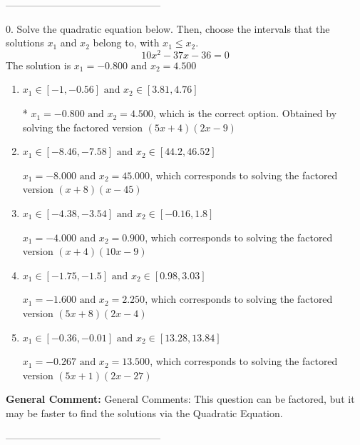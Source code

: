 \documentclass{extbook}[14pt]
\begin{document}
-----------------------------------------------

0. Solve the quadratic equation below. Then, choose the intervals that the solutions $x_1$ and $x_2$ belong to, with $x_1 \leq x_2$.
\[ 10x^{2} -37 x -36 = 0 \] 
The solution is $ x_1 = -0.800 \text{ and } x_2 = 4.500 $ 

\begin{enumerate}[label=\Alph*.] 
\item $ x_1 \in [-1, -0.56] \text{ and } x_2 \in [3.81, 4.76] $ 

 * $x_1 = -0.800 \text{ and } x_2 = 4.500$, which is the correct option. Obtained by solving the factored version $(5x + 4)(2x -9)$ 
\item $ x_1 \in [-8.46, -7.58] \text{ and } x_2 \in [44.2, 46.52] $ 

 $x_1 = -8.000 \text{ and } x_2 = 45.000$, which corresponds to solving the factored version $(x + 8)(x -45)$ 
\item $ x_1 \in [-4.38, -3.54] \text{ and } x_2 \in [-0.16, 1.8] $ 

 $x_1 = -4.000 \text{ and } x_2 = 0.900$, which corresponds to solving the factored version $(x + 4)(10x -9)$ 
\item $ x_1 \in [-1.75, -1.5] \text{ and } x_2 \in [0.98, 3.03] $ 

 $x_1 = -1.600 \text{ and } x_2 = 2.250$, which corresponds to solving the factored version $(5x + 8)(2x -4)$ 
\item $ x_1 \in [-0.36, -0.01] \text{ and } x_2 \in [13.28, 13.84] $ 

 $x_1 = -0.267 \text{ and } x_2 = 13.500$, which corresponds to solving the factored version $(5x + 1)(2x -27)$ 
\end{enumerate} 
 
\textbf{General Comment:} General Comments: This question can be factored, but it may be faster to find the solutions via the Quadratic Equation. 

-----------------------------------------------
\end{document}
